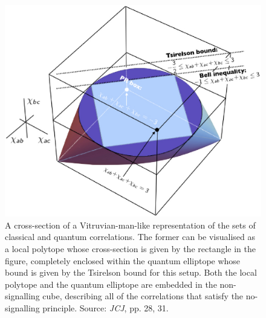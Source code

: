 \documentclass[12pt,english,twoside]{article}
\numberwithin{equation}{section}
\begin{document}
\begin{figure}[t]
  \begin{center}
    \includegraphics[scale=.5]{elliptope-LQPslice}
  \end{center}
  \caption{A cross-section of a Vitruvian-man-like representation of the sets of classical and quantum correlations. The former can be visualised as a local polytope whose cross-section is given by the rectangle in the figure, completely enclosed within the quantum elliptope whose bound is given by the Tsirelson bound for this setup. Both the local polytope and the quantum elliptope are embedded in the non-signalling cube, describing all of the correlations that satisfy the no-signalling principle. Source: \emph{JCJ}, pp. 28, 31.}
  \label{fig:russian_doll}
\end{figure}
\end{document}

